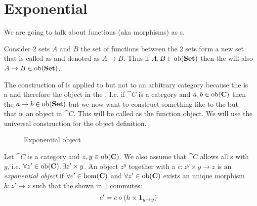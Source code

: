 \section{Exponential}
We are going to talk about functions (aka morphisms) as
s. 

\begin{example}[Homset]
\label{ex:homset}
Consider 2 sets $A$ and $B$ the set of functions between the 2 sets
form a new set that is called as  and denoted as $A
\to B$. Thus if $A,B \in \mathrm{ob}(\mathbf{Set})$ then the  will also $A
\to B \in \mathrm{ob}(\mathbf{Set})$. 
\end{example}

The construction of  is applied to
 but not to an arbitrary category because
the  is a  and therefore the
object in the . I.e. if $\cat{C}$ is a
category and $a, b \in \mathrm{ob}(\mathbf{C})$ 
then the  $a \to b \in \mathrm{ob}(\mathbf{Set})$ but we now want to
construct something like to the  but that is an object in
$\cat{C}$. This will be called as the function object. We will use the
universal construction for the object definition.

\begin{definition}[Exponential]
\label{def:exponential}
\begin{figure}
  \centering
  \caption{Exponential object}
  \label{fig:exponential}
\end{figure}
Let $\cat{C}$ is a category and $z, y \in \mathrm{ob}(\mathbf{C})$. We also assume
that $\cat{C}$ allows all s with $y$, i.e.
$\forall z' \in \mathrm{ob}(\mathbf{C}), \exists z' \times y$. An object $z^y$
together with a  $e: z^y \times y \to z$ is 
an \textit{exponential object} if $\forall e' \in \mathrm{hom}(\mathbf{C})$ and
$\forall z' \in \mathrm{ob}(\mathbf{C})$ exists an
unique morphism $h: z' \to z$ such that the
 shown in \cref{fig:exponential}
commutes:
\[
e' = e \circ \left(h \times \mathbf{1}_{ y \to y } \right)
\]
\end{definition}

